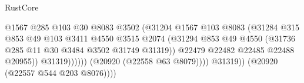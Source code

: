 \begin{lexlean}{RustCore}
\begin{coremodule}
                                                        @1567
                                                        @285
                                                        @103
                                                        @30
                                                        @8083
                                                        @3502
                                                        (@31204
                                                          @1567
                                                          @103
                                                          @8083
                                                          (@31284
                                                            @315
                                                            @853
                                                            @49
                                                            @103
                                                            @3411
                                                            @4550
                                                            @3515
                                                            @2074
                                                            (@31294
                                                              @853
                                                              @49
                                                              @4550
                                                              (@31736
                                                                @285
                                                                @11
                                                                @30
                                                                @3484
                                                                @3502
                                                                @31749
                                                                @31319))
                                                            @22479
                                                            @22482
                                                            @22485
                                                            @22488
                                                            @20955))
                                                        @31319))))))
                                            (@20920 (@22558 @63 @8079))))
                                        @31319))
                                    (@20920 (@22557 @544 @203 @8076))))

\end{coremodule}
\end{lexlean}
